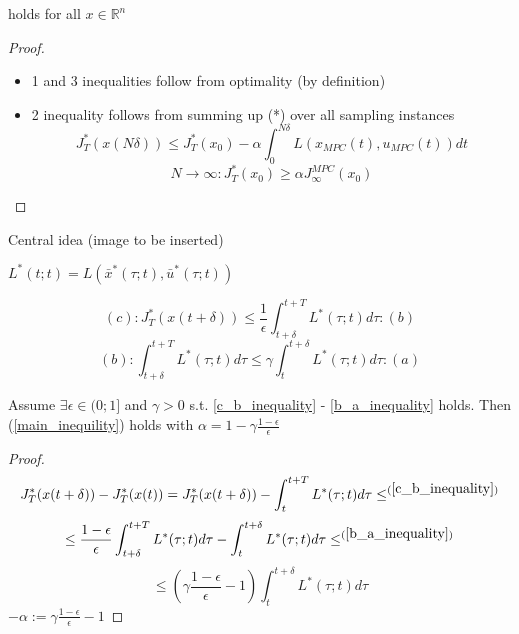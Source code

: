 holds for all $x \in \mathbb{R}^n$

\begin{proof}
\begin{itemize}
\item 1 and 3 inequalities follow from optimality (by definition)
\item 2 inequality follows from summing up (*) over all sampling instances
\begin{equation}
J^*_T(x(N\delta)) \leq J_T^*(x_0) - \alpha \int_0^{N\delta}L(x_{MPC}(t), u_{MPC}(t))dt
\end{equation}
\begin{equation}
N \to \infty : J_T^*(x_0) \geq \alpha J_{\infty}^{MPC}(x_0) 
\end{equation}
\end{itemize}
\end{proof}

Central idea (image to be inserted)

$L^*(t;t) = L(\bar x^*(\tau;t), \bar u^*(\tau;t))$

\begin{equation}\label{c_b_inequality}
(c): J_T^*(x(t+\delta)) \leq \frac{1}{\epsilon} \int_{t+\delta}^{t+T}L^*(\tau;t)d\tau :(b)
\end{equation}
\begin{equation}\label{b_a_inequality}
(b): \int_{t+\delta}^{t+T}L^*(\tau;t)d\tau \leq \gamma \int_{t}^{t+\delta}L^*(\tau;t)d\tau :(a)
\end{equation} 

\begin{Theorem}

Assume $\exists \epsilon \in (0;1]$ and $\gamma > 0$ s.t. \ref{c_b_inequality} - \ref{b_a_inequality} holds. Then (\ref{main_inequility}) holds with $\alpha =1 - \gamma \frac{1-\epsilon}{\epsilon}$

\begin{proof}
\begin{equation*}
J_T^*(x(t+\delta)) - J_T^*(x(t)) = J_T^*(x(t+\delta)) - \int_{t}^{t+T}L^*(\tau;t)d\tau \leq^{(\ref{c_b_inequality})}
\end{equation*}
\begin{equation*}
\leq \frac{1-\epsilon}{\epsilon} \int_{t+\delta}^{t+T}L^*(\tau;t)d\tau - \int_t^{t+\delta}L^*(\tau;t)d\tau \leq^{(\ref{b_a_inequality})}
\end{equation*}
\begin{equation*}
\leq (\gamma \frac{1-\epsilon}{\epsilon} - 1) \int_t^{t+\delta}L^*(\tau;t)d\tau
\end{equation*} 
$-\alpha := \gamma \frac{1-\epsilon}{\epsilon} - 1$ 
\end{proof}
\end{Theorem}

